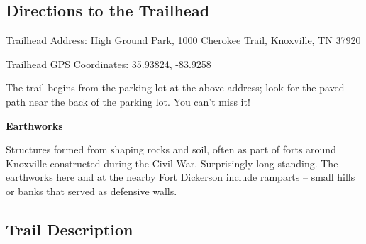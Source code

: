 \documentclass[
  letterpaper,
  DIV=11,
  numbers=noendperiod]{scrreprt}
\begin{document}
\subsection{Directions to the
Trailhead}\label{directions-to-the-trailhead-3}

Trailhead Address: High Ground Park, 1000 Cherokee Trail, Knoxville, TN
37920

Trailhead GPS Coordinates: 35.93824, -83.9258

The trail begins from the parking lot at the above address; look for the
paved path near the back of the parking lot. You can't miss it!

\begin{tcolorbox}[enhanced jigsaw, opacityback=0, bottomrule=.15mm, colframe=quarto-callout-note-color-frame, breakable, arc=.35mm, leftrule=.75mm, rightrule=.15mm, toprule=.15mm, left=2mm, colback=white]
\begin{minipage}[t]{5.5mm}
\textcolor{quarto-callout-note-color}{\faInfo}
\end{minipage}%
\begin{minipage}[t]{\textwidth - 5.5mm}

\vspace{-3mm}\textbf{Earthworks}\vspace{3mm}

Structures formed from shaping rocks and soil, often as part of forts
around Knoxville constructed during the Civil War. Surprisingly
long-standing. The earthworks here and at the nearby Fort Dickerson
include ramparts -- small hills or banks that served as defensive walls.

\end{minipage}%
\end{tcolorbox}

\subsection{Trail Description}\label{trail-description-3}
\end{document}
